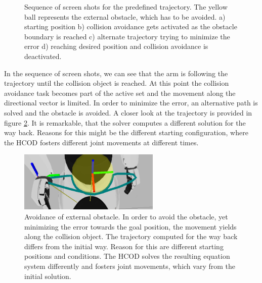 \begin{figure}[h!]
{  	}
\caption{Sequence of screen shots for the predefined trajectory. The yellow ball represents the external obstacle, which has to be avoided. a) starting position b) collision avoidance gets activated as the obstacle boundary is reached c) alternate trajectory trying to minimize the error d) reaching desired position and collision avoidance is deactivated.}
    \label{fig:externarmmoves}
\end{figure}
In the sequence of screen shots, we can see that the arm is following the trajectory until the collision object is reached. At this point the collision avoidance task becomes part of the active set and the movement along the directional vector is limited. In order to minimize the error, an alternative path is solved and the obstacle is avoided.
A closer look at the trajectory is provided in figure \ref{fig:resultexternal}. It is remarkable, that the solver computes a different solution for the way back. Reasons for this might be the different starting configuration, where the HCOD fosters different joint movements at different times.
\begin{figure}[h!]
  \centering
    \includegraphics[width=0.6\textwidth]{../figures/arm_moves/result.png}
    \caption{Avoidance of external obstacle. In order to avoid the obstacle, yet minimizing the error towards the goal position, the movement yields along the collision object. The trajectory computed for the way back differs from the initial way. Reason for this are different starting positions and conditions. The HCOD solves the resulting equation system differently and fosters joint movements, which vary from the initial solution.}
    \label{fig:resultexternal}
\end{figure}


